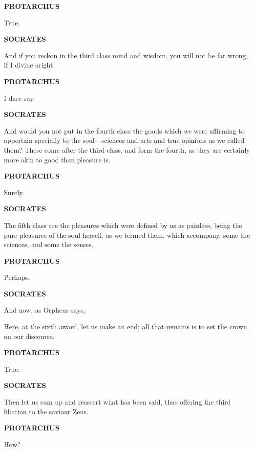 \documentclass[11pt,letter]{article}
\begin{document}
\par \textbf{PROTARCHUS}
\par   True.

\par \textbf{SOCRATES}
\par   And if you reckon in the third class mind and wisdom, you will not be far wrong, if I divine aright.

\par \textbf{PROTARCHUS}
\par   I dare say.

\par \textbf{SOCRATES}
\par   And would you not put in the fourth class the goods which we were affirming to appertain specially to the soul—sciences and arts and true opinions as we called them? These come after the third class, and form the fourth, as they are certainly more akin to good than pleasure is.

\par \textbf{PROTARCHUS}
\par   Surely.

\par \textbf{SOCRATES}
\par   The fifth class are the pleasures which were defined by us as painless, being the pure pleasures of the soul herself, as we termed them, which accompany, some the sciences, and some the senses.

\par \textbf{PROTARCHUS}
\par   Perhaps.

\par \textbf{SOCRATES}
\par   And now, as Orpheus says,
 
\par  Here, at the sixth award, let us make an end; all that remains is to set the crown on our discourse.

\par \textbf{PROTARCHUS}
\par   True.

\par \textbf{SOCRATES}
\par   Then let us sum up and reassert what has been said, thus offering the third libation to the saviour Zeus.

\par \textbf{PROTARCHUS}
\par   How?
\end{document}
